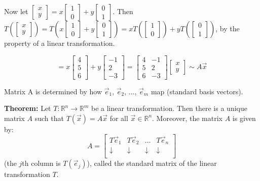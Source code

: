 \documentclass{article}
\begin{document}
Now let \( \begin{bmatrix} x \\ y \end{bmatrix} = x\begin{bmatrix} 1 \\ 0 \end{bmatrix} + y\begin{bmatrix} 0 \\ 1 \end{bmatrix} \). Then \( T(\begin{bmatrix} x \\ y \end{bmatrix}) = T(x\begin{bmatrix} 1 \\ 0 \end{bmatrix} + y\begin{bmatrix} 0 \\ 1 \end{bmatrix}) = xT(\begin{bmatrix} 1 \\ 0 \end{bmatrix}) + yT(\begin{bmatrix} 0 \\ 1 \end{bmatrix}) \), by the property of a linear transformation.


\[
= x\begin{bmatrix} 4 \\ 5 \\ 6 \end{bmatrix} + y\begin{bmatrix} -1 \\ 2 \\ -3 \end{bmatrix} = \begin{bmatrix} 4 & -1 \\ 5 & 2 \\ 6 & -3 \end{bmatrix} \begin{bmatrix} x \\ y \end{bmatrix} \sim A\vec{x}
\]


Matrix A is determined by how $\vec{e}_1$, $\vec{e}_2$, $\ldots$, $\vec{e}_m$ map (standard basis vectors). 

\textbf{Theorem:} Let $T: \mathbb{R}^n \rightarrow \mathbb{R}^m$ be a linear transformation. Then there is a unique matrix $A$ such that $T(\vec{x}) = A\vec{x}$ for all $\vec{x} \in \mathbb{R}^n$. Moreover, the matrix $A$ is given by:
\[ A = \begin{bmatrix}
    T\vec{e}_1 & T\vec{e}_2 & \ldots & T\vec{e}_n \\
    \downarrow & \downarrow & \downarrow & \downarrow \\
\end{bmatrix} \]
(the $j$th column is $T(\vec{e}_j)$), called the standard matrix of the linear transformation $T$.
\end{document}
